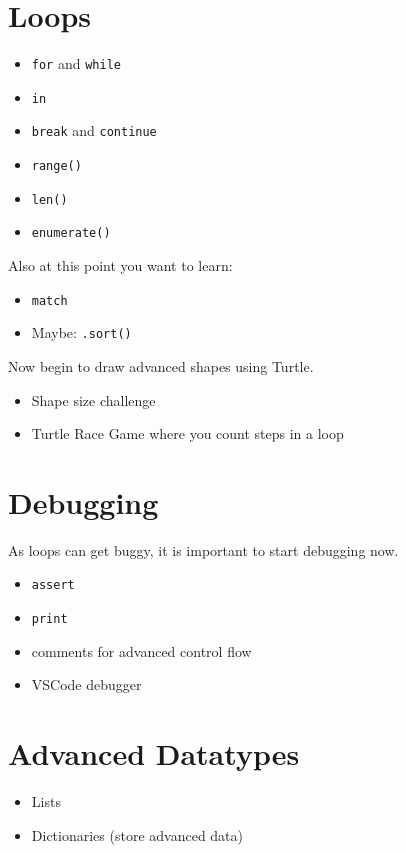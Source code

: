 \documentclass{article}
\begin{document}
\section{Loops}

\begin{itemize}
    \item \verb|for| and \verb|while|
    \item \verb|in|
    \item \verb|break| and \verb|continue|
    \item \verb|range()|
    \item \verb|len()|
    \item \verb|enumerate()| 
\end{itemize}

Also at this point you want to learn:

\begin{itemize}
    \item \verb|match|
    \item Maybe: \verb|.sort()|
\end{itemize}

Now begin to draw advanced shapes using Turtle.

\begin{itemize}
    \item Shape size challenge
    \item Turtle Race Game where you count steps in a loop
\end{itemize}

\section{Debugging}
As loops can get buggy, it is important to start debugging now.

\begin{itemize}
    \item \verb|assert|
    \item \verb|print|
    \item comments for advanced control flow
    \item VSCode debugger
\end{itemize} 

\section{Advanced Datatypes}

\begin{itemize}
    \item Lists
    \item Dictionaries (store advanced data)
\end{itemize}
\end{document}

